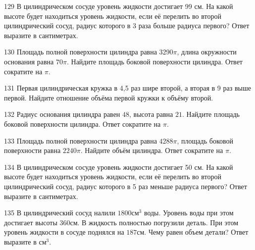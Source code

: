 \documentclass[4apaper]{article}
\begin{document}
\begin{taskBN}{129}
В цилиндрическом сосуде уровень жидкости достигает 99 см. На какой высоте будет находиться уровень жидкости, если её перелить во второй цилиндрический сосуд, радиус которого в 3 раза больше радиуса первого? Ответ выразите в сантиметрах.
\end{taskBN}

\begin{taskBN}{130}
Площадь полной поверхности цилиндра равна $3290\pi$, длина окружности основания равна $70\pi$. Найдите площадь боковой поверхности цилиндра. Ответ сократите на $\pi$.
\end{taskBN}

\begin{taskBN}{131}
 Первая цилиндрическая кружка в 4,5 раз шире второй, а вторая в 9 раз выше первой. Найдите отношение объёма первой кружки к объёму второй.
\end{taskBN}

\begin{taskBN}{132}
Радиус основания цилиндра равен $48$, высота равна $21$. Найдите площадь боковой поверхности цилиндра. Ответ сократите на $\pi$.
\end{taskBN}

\begin{taskBN}{133}
Площадь полной поверхности цилиндра равна $4288\pi$, площадь боковой поверхности равна $2240\pi$. Найдите объём цилиндра. Ответ сократите на $\pi$.
\end{taskBN}

\begin{taskBN}{134}
В цилиндрическом сосуде уровень жидкости достигает 50 см. На какой высоте будет находиться уровень жидкости, если её перелить во второй цилиндрический сосуд, радиус которого в 5 раз меньше радиуса первого? Ответ выразите в сантиметрах.
\end{taskBN}

\begin{taskBN}{135}
В цилиндрический сосуд налили $1800\mbox{см}^3$ воды. Уровень воды при этом достигает высоты $360$см. В жидкость полностью погрузили деталь. При этом уровень жидкости в сосуде поднялся на $187$см. Чему равен объем детали? Ответ выразите в $\mbox{см}^3$.
\end{taskBN}
\end{document}
